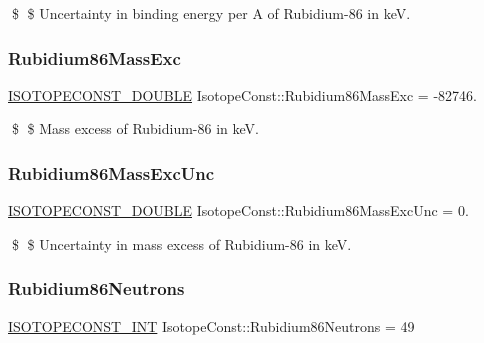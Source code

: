 \$ \$ Uncertainty in binding energy per A of Rubidium-\/86 in keV. \mbox{\label{group___isotope_const-_rubidium-_rb86_gaa732a16a4be53e97d5d939486364e53a}} 
\subsubsection{\texorpdfstring{Rubidium86\+Mass\+Exc}{Rubidium86MassExc}}
{\footnotesize\ttfamily \mbox{\hyperlink{group___isotope_const-_macros_ga8f45a7272ce02c0b4c65c44636ed719a}{I\+S\+O\+T\+O\+P\+E\+C\+O\+N\+S\+T\+\_\+\+D\+O\+U\+B\+LE}} Isotope\+Const\+::\+Rubidium86\+Mass\+Exc = -\/82746.}

\$ \$ Mass excess of Rubidium-\/86 in keV. \mbox{\label{group___isotope_const-_rubidium-_rb86_gac576ad97d0bb793165f3b19235c29e86}} 
\subsubsection{\texorpdfstring{Rubidium86\+Mass\+Exc\+Unc}{Rubidium86MassExcUnc}}
{\footnotesize\ttfamily \mbox{\hyperlink{group___isotope_const-_macros_ga8f45a7272ce02c0b4c65c44636ed719a}{I\+S\+O\+T\+O\+P\+E\+C\+O\+N\+S\+T\+\_\+\+D\+O\+U\+B\+LE}} Isotope\+Const\+::\+Rubidium86\+Mass\+Exc\+Unc = 0.}

\$ \$ Uncertainty in mass excess of Rubidium-\/86 in keV. \mbox{\label{group___isotope_const-_rubidium-_rb86_gab0a9e68245a8469ce60dc8a04b118ceb}} 
\subsubsection{\texorpdfstring{Rubidium86\+Neutrons}{Rubidium86Neutrons}}
{\footnotesize\ttfamily \mbox{\hyperlink{group___isotope_const-_macros_ga5f18360b3e99483a35c32d789e62621c}{I\+S\+O\+T\+O\+P\+E\+C\+O\+N\+S\+T\+\_\+\+I\+NT}} Isotope\+Const\+::\+Rubidium86\+Neutrons = 49}

